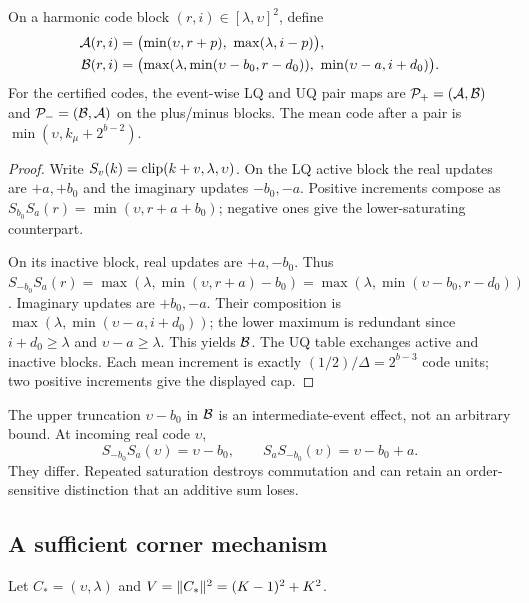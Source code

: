 \begin{theorem}\label{thm:pairmaps}
On a harmonic code block $(r,i)\in[\lambda,\upsilon]^2$, define
\begin{equation}\label{eq:AB}
 \begin{aligned}
 \mathcal A(r,i)&=\bigl(\min(\upsilon,r+p),\ \max(\lambda,i-p)\bigr),\\
 \mathcal B(r,i)&=\bigl(\max(\lambda,\min(\upsilon-b_0,r-d_0)),\
                         \min(\upsilon-a,i+d_0)\bigr).
 \end{aligned}
\end{equation}
For the certified codes, the event-wise LQ and UQ pair maps are
$\mathcal P_+=(\mathcal A,\mathcal B)$ and $\mathcal P_-=(\mathcal B,\mathcal A)$ on the plus/minus blocks. The mean code after a pair is $\min(\upsilon,k_\mu+2^{b-2})$.
\end{theorem}
\begin{proof}
Write $S_v(k)=\operatorname{clip}(k+v,\lambda,\upsilon)$. On the LQ active block the real updates are $+a,+b_0$ and the imaginary updates $-b_0,-a$. Positive increments compose as $S_{b_0}S_a(r)=\min(\upsilon,r+a+b_0)$; negative ones give the lower-saturating counterpart.

On its inactive block, real updates are $+a,-b_0$. Thus
$S_{-b_0}S_a(r)=\max(\lambda,\min(\upsilon,r+a)-b_0)
=\max(\lambda,\min(\upsilon-b_0,r-d_0))$.
Imaginary updates are $+b_0,-a$. Their composition is
$\max(\lambda,\min(\upsilon-a,i+d_0))$; the lower maximum is redundant since $i+d_0\ge\lambda$ and $\upsilon-a\ge\lambda$. This yields $\mathcal B$. The UQ table exchanges active and inactive blocks. Each mean increment is exactly $(1/2)/\Delta=2^{b-3}$ code units; two positive increments give the displayed cap.
\end{proof}
The upper truncation $\upsilon-b_0$ in $\mathcal B$ is an intermediate-event effect, not an arbitrary bound. At incoming real code $\upsilon$,
\[
 S_{-b_0}S_a(\upsilon)=\upsilon-b_0,\qquad
 S_aS_{-b_0}(\upsilon)=\upsilon-b_0+a .
\]
They differ. Repeated saturation destroys commutation and can retain an order-sensitive distinction that an additive sum loses.

\subsection{A sufficient corner mechanism}
Let $C_*=(\upsilon,\lambda)$ and $V=\lVert C_*\rVert^2=(K-1)^2+K^2$.

